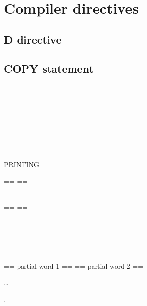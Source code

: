 \chapter{Compiler directives}

\section{D directive}


\section{COPY statement}

\begin{1=}
   \\
\end{1=}
\begin{1=}
  \literal \\
  \textname \\
\end{1=}
\begin{0-1}
  \begin{1=}
     \\
  \end{1=}
  \begin{1=}
    \literal \\
    \libraryname
  \end{1=}
\end{0-1}

\begin{0-1}
   PRINTING
\end{0-1}

\begin{0-1}
  \begin{1=}
    \begin{1=}
      == \pseudotext == \\
      \identifier \\
      \literal
    \end{1=}
    \begin{1=}
      == \pseudotext == \\
      \identifier \\
      \literal
    \end{1=} \\

    \begin{1=}
       \\
    \end{1=}
    == partial-word-1 ==
    == partial-word-2 ==
  \end{1=}\ldots
\end{0-1}
.

